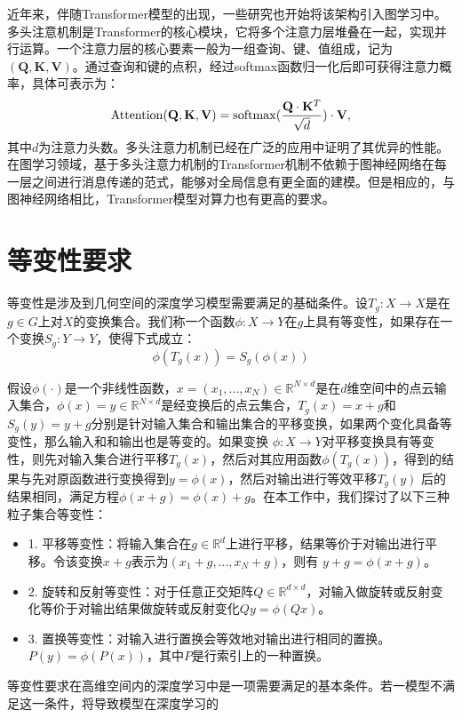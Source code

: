 近年来，伴随Transformer模型的出现，一些研究也开始将该架构引入图学习中。多头注意机制是Transformer的核心模块，它将多个注意力层堆叠在一起，实现并行运算。一个注意力层的核心要素一般为一组查询、键、值组成，记为$(\mathbf{Q}, \mathbf{K}, \mathbf{V})$。通过查询和键的点积，经过softmax函数归一化后即可获得注意力概率，具体可表示为：
\begin{eqnarray}
    {\rm Attention}(\mathbf{Q}, \mathbf{K}, \mathbf{V}) = {\rm softmax}(\frac{\mathbf{Q} \cdot \mathbf{K}^T}{\sqrt{d}}) \cdot \mathbf{V},
\end{eqnarray}
其中$d$为注意力头数。多头注意力机制已经在广泛的应用中证明了其优异的性能。在图学习领域，基于多头注意力机制的Transformer机制不依赖于图神经网络在每一层之间进行消息传递的范式，能够对全局信息有更全面的建模。但是相应的，与图神经网络相比，Transformer模型对算力也有更高的要求。

\section{等变性要求}
等变性是涉及到几何空间的深度学习模型需要满足的基础条件。设$T_g: X \to X$是在$g \in G$上对$X$的变换集合。我们称一个函数$\phi: X \to Y$在$g$上具有等变性，如果存在一个变换$S_g: Y \to Y$，使得下式成立：
\begin{equation}
    \phi (T_g(x)) = S_g(\phi (x))
\end{equation}

假设$\phi (\cdot)$是一个非线性函数，$x = (x_1, ..., x_N) \in \mathbb{R}^{N \times d}$是在$d$维空间中的点云输入集合，$\phi (x) = y \in \mathbb{R}^{N \times d}$是经变换后的点云集合，$T_g (x) = x + g$和$S_g(y) = y + g$分别是针对输入集合和输出集合的平移变换，如果两个变化具备等变性，那么输入和和输出也是等变的。如果变换 $\phi : X \to Y$对平移变换具有等变性，则先对输入集合进行平移$T_g(x)$，然后对其应用函数$\phi(T_g(x))$，得到的结果与先对原函数进行变换得到$y = \phi(x)$，然后对输出进行等效平移$T_g(y)$ 后的结果相同，满足方程$\phi (x+g) = \phi (x) + g$。在本工作中，我们探讨了以下三种粒子集合等变性：
\begin{itemize}
    \item 1. 平移等变性：将输入集合在$g \in \mathbb{R}^d$上进行平移，结果等价于对输出进行平移。令该变换$x + g$表示为$(x_1+g, ..., x_N + g)$，则有 $y+g = \phi (x+g)$。
    \item 2. 旋转和反射等变性：对于任意正交矩阵$Q \in \mathbb{R}^{d \times d}$，对输入做旋转或反射变化等价于对输出结果做旋转或反射变化$Qy = \phi(Qx)$。
    \item 3. 置换等变性：对输入进行置换会等效地对输出进行相同的置换。$P(y) = \phi(P(x))$，其中$P$是行索引上的一种置换。
\end{itemize}
等变性要求在高维空间内的深度学习中是一项需要满足的基本条件。若一模型不满足这一条件，将导致模型在深度学习的


